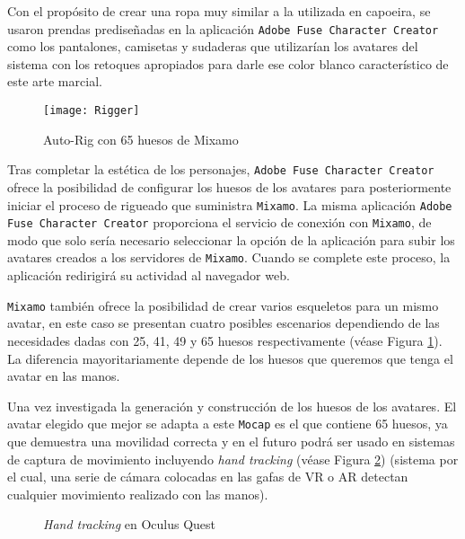 Con el propósito de crear una ropa muy similar a la utilizada en capoeira, se usaron prendas prediseñadas en la aplicación \texttt{Adobe Fuse Character Creator} como los pantalones, camisetas y sudaderas que utilizarían los avatares del sistema con los retoques apropiados para darle ese color blanco característico de este arte marcial.

\begin{figure}[h!]
    \centering 
    \texttt{[image: Rigger]}
    \caption{Auto-Rig con 65 huesos de Mixamo}
    \label{fig:Rigger}
\end{figure} 

Tras completar la estética de los personajes, \texttt{Adobe Fuse Character Creator} ofrece la posibilidad de configurar los huesos de los avatares para posteriormente iniciar el proceso de rigueado que suministra \texttt{Mixamo}. La misma aplicación \texttt{Adobe Fuse Character Creator} proporciona el servicio de conexión con \texttt{Mixamo}, de modo que solo sería necesario seleccionar la opción de la aplicación para subir los avatares creados a los servidores de \texttt{Mixamo}. Cuando se complete este proceso, la aplicación redirigirá su actividad al navegador web. 

\texttt{Mixamo} también ofrece la posibilidad de crear varios esqueletos para un mismo avatar, en este caso se presentan cuatro posibles escenarios dependiendo de las necesidades dadas con 25, 41, 49 y 65 huesos respectivamente (véase Figura \ref{fig:Rigger}). La diferencia mayoritariamente depende de los huesos que queremos que tenga el avatar en las manos.

Una vez investigada la generación y construcción de los huesos de los avatares. El avatar elegido que mejor se adapta a este \texttt{Mocap} es el que contiene 65 huesos, ya que demuestra una movilidad correcta y en el futuro podrá ser usado en sistemas de captura de movimiento incluyendo \textit{hand tracking} (véase Figura \ref{fig:HandTracking}) (sistema por el cual, una serie de cámara colocadas en las gafas de VR o AR detectan cualquier movimiento realizado con las manos).

\begin{figure}[h!]
    \centering
    \caption{\textit{Hand tracking} en Oculus Quest}
    \label{fig:HandTracking}  
\end{figure}





